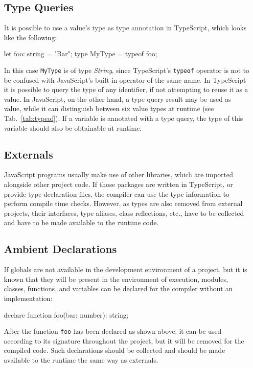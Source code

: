 \subsection{Type Queries}

It is possible to use a value's type as type annotation in TypeScript, which looks like the following:
\begin{JsCode}[numbers=none]
let foo: string = "Bar";
type MyType = typeof foo;
\end{JsCode}
In this case \texttt{MyType} is of type \emph{String}, since TypeScript's \texttt{typeof} operator is not to be confused with JavaScript's built in operator of the same name. In TypeScript it is possible to query the type of any identifier, if not attempting to reuse it as a value. In JavaScript, on the other hand, a type query result may be used as value, while it can distinguish between six value types at runtime (see Tab.~\ref{tab:typeof}). If a variable is annotated with a type query, the type of this variable should also be obtainable at runtime.

\subsection{Externals}

JavaScript programs usually make use of other libraries, which are imported alongside 
other project code. If those packages are written in TypeScript, or provide type declaration files, the compiler can use the type information to perform compile time checks. However, as types are also removed from external projects, their interfaces, type aliases, class reflections, etc., have to be collected and have to be made available to the runtime code.

\subsection{Ambient Declarations}

If globals are not available in the development environment of a project, but it is known that they will be present in the environment of execution, modules, classes, functions, and variables can be declared for the compiler without an implementation:
\begin{JsCode}[numbers=none]
declare function foo(bar: number): string;
\end{JsCode}
After the function \texttt{foo} has been declared as shown above, it can be used according to its signature throughout the project, but it will be removed for the compiled code. Such declarations should be collected and should be made available to the runtime the same way as externals.

